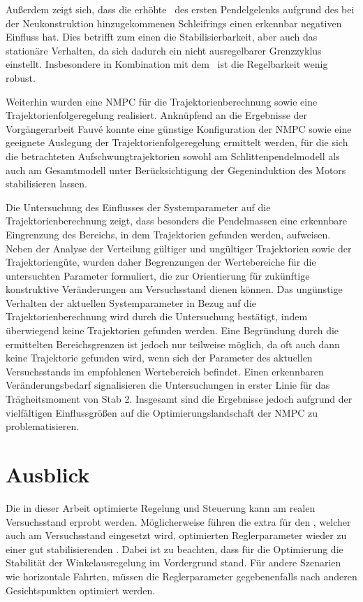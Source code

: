 Außerdem zeigt sich, dass die erhöhte \crb\ des ersten Pendelgelenks aufgrund des bei der Neukonstruktion hinzugekommenen Schleifrings einen erkennbar negativen Einfluss hat.
Dies betrifft zum einen die Stabilisierbarkeit, aber auch das stationäre Verhalten, da sich dadurch ein nicht ausregelbarer Grenzzyklus einstellt.
Insbesondere in Kombination mit dem \beob\ ist die Regelbarkeit wenig robust.

Weiterhin wurden eine NMPC für die Trajektorienberechnung sowie eine Trajektorienfolgeregelung realisiert. Anknüpfend an die Ergebnisse der Vorgängerarbeit Fauvé \cite{fauve} konnte eine günstige Konfiguration der NMPC sowie eine geeignete Auslegung der Trajektorienfolgeregelung ermittelt werden, für die sich die betrachteten Aufschwungtrajektorien sowohl am Schlittenpendelmodell als auch am Gesamtmodell unter Berücksichtigung der Gegeninduktion des Motors stabilisieren lassen.

Die Untersuchung des Einflusses der Systemparameter auf die Trajektorienberechnung zeigt, dass besonders die Pendelmassen eine erkennbare Eingrenzung des Bereichs, in dem Trajektorien gefunden werden, aufweisen. Neben der Analyse der Verteilung gültiger und ungültiger Trajektorien sowie der Trajektoriengüte, wurden daher Begrenzungen der Wertebereiche für die untersuchten Parameter formuliert, die zur Orientierung für zukünftige konstruktive Veränderungen am Versuchsstand dienen können. 
Das ungünstige Verhalten der aktuellen Systemparameter in Bezug auf die Trajektorienberechnung wird durch die Untersuchung bestätigt, indem überwiegend keine Trajektorien gefunden werden. %
Eine Begründung durch die ermittelten Bereichsgrenzen ist jedoch nur teilweise möglich, da oft auch dann keine Trajektorie gefunden wird, wenn sich der Parameter des aktuellen Versuchsstands im empfohlenen Wertebereich befindet. Einen erkennbaren Veränderungsbedarf signalisieren die Untersuchungen in erster Linie für das Trägheitsmoment von Stab 2. 
Insgesamt sind die Ergebnisse jedoch aufgrund der vielfältigen Einflussgrößen auf die Optimierungslandschaft der NMPC zu problematisieren. %

  

\section{Ausblick}

Die in dieser Arbeit optimierte Regelung und Steuerung kann am realen Versuchsstand erprobt werden.
Möglicherweise führen die extra für den \beob, welcher auch am Versuchsstand eingesetzt wird, optimierten Reglerparameter wieder zu einer gut stabilisierenden \aprg.
Dabei ist zu beachten, dass für die Optimierung die Stabilität der Winkelausregelung im Vordergrund stand.
Für andere Szenarien wie horizontale Fahrten, müssen die Reglerparameter gegebenenfalls nach anderen Gesichtspunkten optimiert werden.

